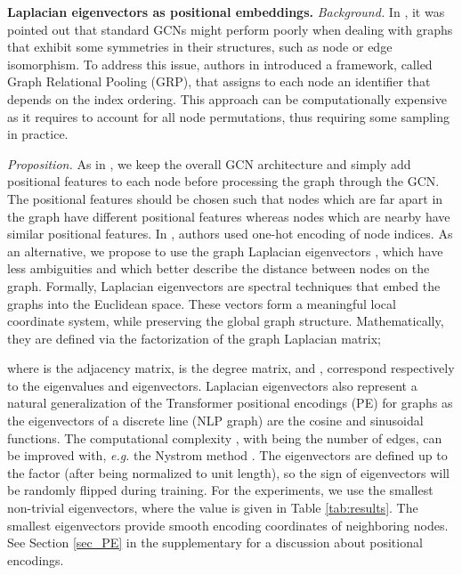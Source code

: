 \documentclass{article}
\begin{document}
{\bf Laplacian eigenvectors as positional embeddings.} {\it Background.} In \cite{murphy2019relational,srinivasan2019equivalence}, it was pointed out that standard GCNs might perform poorly when dealing with graphs that exhibit some symmetries in their structures, such as node or edge isomorphism. To address this issue, authors in \cite{murphy2019relational} introduced a framework, called Graph Relational Pooling (GRP), that assigns to each node an identifier that depends on the index ordering. This approach can be computationally expensive as it requires to account for all  node permutations, thus requiring some sampling in practice. 



\vspace{-0.1cm}
{\it Proposition.} As in \cite{murphy2019relational}, we keep the overall GCN architecture and simply add positional features to each node before processing the graph through the GCN. The positional features should be chosen such that nodes which are far apart in the graph have different positional features whereas nodes which are nearby have similar positional features. In \cite{murphy2019relational}, authors used one-hot encoding of node indices. As an alternative, we propose to use the graph Laplacian eigenvectors \cite{belkin2003laplacian}, which have less ambiguities and which better describe the distance between nodes on the graph. Formally, Laplacian eigenvectors are spectral techniques that embed the graphs into the Euclidean space. These vectors form a meaningful local coordinate system, while preserving the global graph structure. Mathematically, they are defined via the factorization of the graph Laplacian matrix;
\vspace{-0.1cm}

where  is the   adjacency matrix,  is the degree matrix, and ,  correspond respectively to the eigenvalues and eigenvectors. Laplacian eigenvectors also represent a natural generalization of the Transformer \cite{vaswani2017attention} positional encodings (PE) for graphs as the eigenvectors of a discrete line (NLP graph) are the cosine and sinusoidal functions. The computational complexity , with  being the number of edges, can be improved with, \textit{e.g.} the Nystrom method \cite{fowlkes2004spectral}. The eigenvectors are defined up to the factor  (after being normalized to unit length), so the sign of eigenvectors will be randomly flipped during training. For the experiments, we use the  smallest non-trivial eigenvectors, where the  value is given in Table \ref{tab:results}. The smallest eigenvectors provide smooth encoding coordinates of neighboring nodes. See Section \ref{sec_PE} in the supplementary for a discussion about positional encodings.
\end{document}
